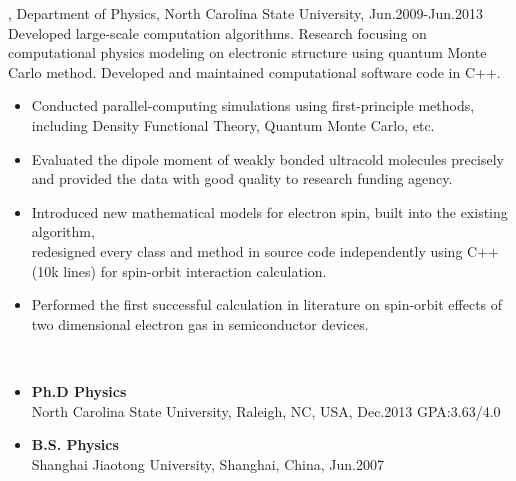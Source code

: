 \documentclass[11pt]{article} %
\begin{document}
, Department of Physics, North Carolina State University, Jun.2009-Jun.2013\\
\noindent Developed large-scale computation algorithms. Research focusing on computational physics modeling on electronic structure using quantum Monte Carlo method. Developed and maintained computational software code in C++.\\
\begin{itemize}
  \item Conducted parallel-computing simulations using first-principle methods, including Density Functional Theory, Quantum Monte Carlo, etc.\\
\vspace{-4mm}
   \item Evaluated the dipole moment of weakly bonded ultracold molecules precisely and provided
the data with good quality to research funding agency.\\
\vspace{-4mm}
  \item Introduced new mathematical models for electron spin, built into the existing algorithm,\\
  redesigned every class and method in source code independently using C++(10k lines) for spin-orbit interaction calculation.\\

\vspace{-4mm}
   \item Performed the first successful calculation in literature on spin-orbit effects of two dimensional electron gas in semiconductor devices.\\
\end{itemize}
\vspace{-3mm}
 \\
\vspace{-5mm}
\begin{itemize}
  \item {\bf Ph.D Physics} \hspace{100mm}   \\
    North Carolina State University, Raleigh, NC, USA, Dec.2013 \hspace*{2mm} GPA:3.63/4.0\\
\vspace{-4mm}
  \item {\bf B.S. Physics}\\
    Shanghai Jiaotong University, Shanghai, China, Jun.2007\\
\vspace{0mm}
\end{itemize}
\end{document}
